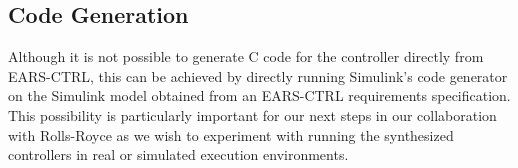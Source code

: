 \subsection{Code Generation}
Although it is not possible to generate C code for the controller
directly from \textsf{EARS-CTRL}, this can be achieved by directly running Simulink's code
generator on the Simulink model obtained from an \textsf{EARS-CTRL} requirements
specification. This possibility is particularly important for our next steps in
our collaboration with Rolls-Royce as we wish to experiment with running the
synthesized controllers in real or simulated execution environments.
